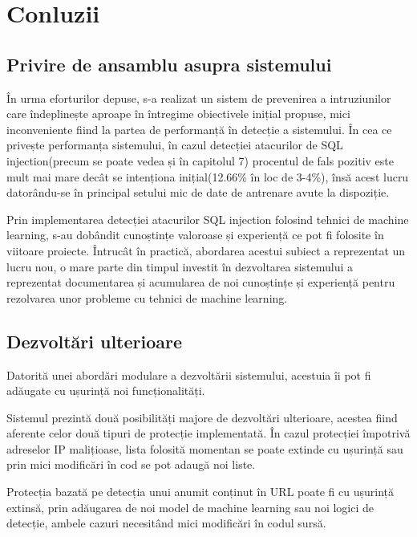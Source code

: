 
 \chapter{Conluzii}
\label{cap:concluzii}
\section{Privire de ansamblu asupra sistemului}

În urma eforturilor depuse, s-a realizat un sistem de prevenirea a intruziunilor care îndeplinește aproape în întregime obiectivele inițial propuse, mici inconveniente fiind la partea de performanță în detecție a sistemului. În cea ce privește performanța sistemului, în cazul detecției atacurilor de SQL injection(precum se poate vedea și în capitolul 7) procentul de fals pozitiv este mult mai mare decât se intenționa inițial(12.66\% în loc de 3-4\%), însă acest lucru datorându-se în principal setului mic de date de antrenare avute la dispoziție. 

Prin implementarea detecției atacurilor SQL injection folosind tehnici de machine learning, s-au dobândit cunoștințe valoroase și experiență ce pot fi folosite în viitoare proiecte. Întrucât în practică, abordarea acestui subiect a reprezentat un lucru nou, o mare parte din timpul investit în dezvoltarea sistemului a reprezentat documentarea și acumularea de noi cunoștințe și experiență pentru rezolvarea unor probleme cu tehnici de machine learning. 

\section{Dezvoltări ulterioare}

Datorită unei abordări modulare a dezvoltării sistemului, acestuia îi pot fi adăugate cu ușurință noi funcționalități. 

Sistemul prezintă două posibilități majore de dezvoltări ulterioare, acestea fiind aferente celor două tipuri de protecție implementată. În cazul protecției împotrivă adreselor IP malițioase, lista folosită momentan se poate extinde cu ușurință sau prin mici modificări în cod se pot adaugă noi liste. 

Protecția bazată pe detecția unui anumit conținut în URL poate fi cu ușurință extinsă, prin adăugarea de noi model de machine learning sau noi logici de detecție, ambele cazuri necesitând mici modificări în codul sursă. 

